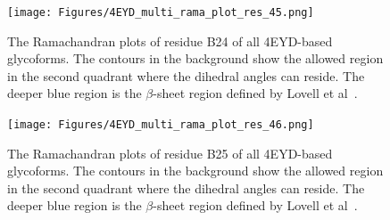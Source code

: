 \documentclass[sn-vancouver]{sn-jnl}
\begin{document}
\renewcommand{\thefigure}{S\arabic{figure}}
\begin{figure}[H]
\centering
\texttt{[image: Figures/4EYD\_multi\_rama\_plot\_res\_45.png]}
\caption{The Ramachandran plots of residue B24 of all 4EYD-based glycoforms. The contours in the background show the allowed region in the second quadrant where the dihedral angles can reside. The deeper blue region is the $\beta$-sheet region defined by Lovell et al~\cite{lovell2003structure}.}
\end{figure}

\renewcommand{\thefigure}{S\arabic{figure}}
\begin{figure}[H]
\centering
\texttt{[image: Figures/4EYD\_multi\_rama\_plot\_res\_46.png]}
\caption{The Ramachandran plots of residue B25 of all 4EYD-based glycoforms. The contours in the background show the allowed region in the second quadrant where the dihedral angles can reside. The deeper blue region is the $\beta$-sheet region defined by Lovell et al~\cite{lovell2003structure}.}
\end{figure}


\end{document}
